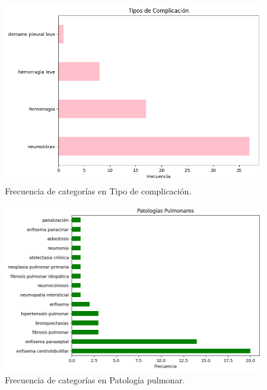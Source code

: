 \begin{figure}[!htbp]
    \centering
    \includegraphics[width=1\textwidth]{img/barras_tipo_complicacion.png}
    \caption{Frecuencia de categorías en Tipo de complicación.}
    \label{fig:distribucion_tipo_complicacion}
\end{figure}


\begin{figure}[!htbp]
    \centering
    \includegraphics[width=1\textwidth]{img/barras_patologia_pulmonar.png}
    \caption{Frecuencia de categorías en Patología pulmonar.}
    \label{fig:distribucion_patologia_pulmonar}
\end{figure}


